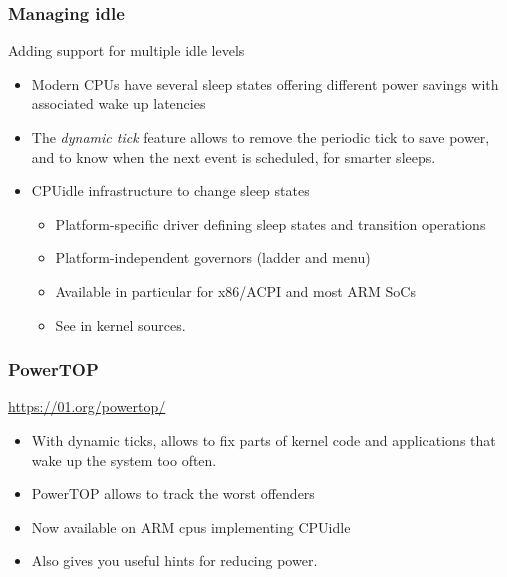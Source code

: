 \begin{frame}
  \frametitle{Managing idle}
  Adding support for multiple idle levels
  \begin{itemize}
  \item Modern CPUs have several sleep states offering different
    power savings with associated wake up latencies
  \item The {\em dynamic tick} feature allows to remove the
    periodic tick to save power, and to know when the next event is
    scheduled, for smarter sleeps.
  \item CPUidle infrastructure to change sleep states
    \begin{itemize}
    \item Platform-specific driver defining sleep states and
      transition operations
    \item Platform-independent governors (ladder and menu)
    \item Available in particular for x86/ACPI and most ARM SoCs
    \item See  in kernel sources.
    \end{itemize}
  \end{itemize}
\end{frame}

\begin{frame}
  \frametitle{PowerTOP}
  \url{https://01.org/powertop/}
  \begin{itemize}
  \item With dynamic ticks, allows to fix parts of kernel code and
    applications that wake up the system too often.
  \item PowerTOP allows to track the worst offenders
  \item Now available on ARM cpus implementing CPUidle
  \item Also gives you useful hints for reducing power.
  \end{itemize}
\end{frame}

